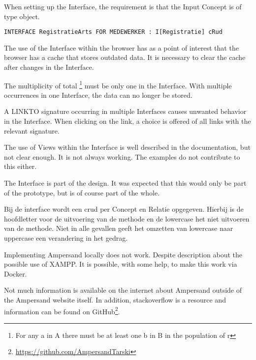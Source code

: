 When setting up the Interface, the requirement is that the Input Concept is of type object.
\begin{lstlisting}
INTERFACE RegistratieArts FOR MEDEWERKER : I[Registratie] cRud
\end{lstlisting}

The use of the Interface within the browser has as a point of interest that the browser has a cache that stores outdated data.
It is necessary to clear the cache after changes in the Interface.

The multiplicity of total \footnote{For any a in A there must be at least one b in B in the population of r} must be only one in the Interface.
With multiple occurrences in one Interface, the data can no longer be stored.

A LINKTO signature occurring in multiple Interfaces causes unwanted behavior in the Interface.
When clicking on the link, a choice is offered of all links with the relevant signature.

The use of Views within the Interface is well described in the documentation, but not clear enough.
It is not always working.
The examples do not contribute to this either.

The Interface is part of the design.
It was expected that this would only be part of the prototype, but is of course part of the whole.

Bij de interface wordt een \acrfull{crud} per Concept en Relatie opgegeven.
Hierbij is de hoofdletter voor de uitvoering van de methode en de lowercase het niet uitvoeren van de methode.
Niet in alle gevallen geeft het  omzetten van lowercase naar uppercase een verandering in het gedrag.


Implementing Ampersand locally does not work.
Despite description about the possible use of XAMPP.
It is possible, with some help, to make this work via Docker.

Not much information is available on the internet about Ampersand outside of the Ampersand website itself.
In addition, stackoverflow is a resource and information can be found on GitHub\footnote{\url{https://github.com/AmpersandTarski}}.

